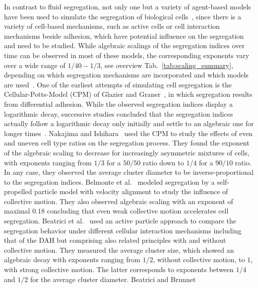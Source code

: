 \documentclass[10pt,letterpaper]{article}
\newcommand{\tabref}[1]{Tab.~\ref{tab:#1}}
\begin{document}
In contrast to fluid segregation, not only one but a variety of
agent-based models have been used to simulate the segregation of
biological
cells~\cite{ZhaThoSwaShiGla2011,MehVic2013,OsbFlePitMaiGav2017}, since
there is a variety of cell-based mechanisms, such as active cells or
cell interaction mechanisms beside adhesion, which have potential
influence on the segregation and need to be studied. While algebraic
scalings of the segregation indices over time can be observed in most
of these models, the corresponding exponents vary over a wide range of
$1/40 - 1/3$, see overview \tabref{scaling_summary}, depending on which segregation mechanisms are
incorporated and which models are used~\cite{BelThoBruAlmCha2008,
  NakIsh2011, BeaBru2011, StrJuuBauKabDuk2014,Dur2021,Kab2012}. One of
the earliest attempts of simulating cell segregation is the
Cellular-Potts-Model (CPM) of Glazier and Graner~\cite{GlaGra1992,
  GlaGra1993}, in which segregation results from differential
adhesion. While the observed segregation indices display a logarithmic
decay, successive studies concluded that the segregation indices
actually follow a logarithmic decay only initially and settle to an
algebraic one for longer
times~\cite{NakIsh2011,BelThoBruAlmCha2008,BeaBru2011,BeaAlmBru2017,Kra2020,Dur2021}.
Nakajima and Ishihara~\cite{NakIsh2011} used the CPM to study the
effects of even and uneven cell type ratios on the segregation
process. They found the exponent of the algebraic scaling to decrease
for increasingly asymmetric mixtures of cells, with exponents ranging
from $1/3$ for a $50/50$ ratio down to $1/4$ for a $90/10$ ratio. In
any case, they observed the average cluster diameter to be
inverse-proportional to the segregation indices. Belmonte et
al.~\cite{BelThoBruAlmCha2008} modeled segregation by a self-propelled
particle model with velocity alignment to study the influence of
collective motion. They also observed algebraic scaling with an
exponent of maximal $0.18$ concluding that even weak collective motion
accelerates cell segregation. Beatrici et al.~\cite{BeaAlmBru2017} used an
active particle approach to compare the segregation behavior under different cellular
interaction mechanisms including that of the DAH but comprising also related principles with
and without collective motion. They measured the average cluster size, which
showed an algebraic decay with exponents ranging from $1/2$, without
collective motion, to $1$, with strong collective motion. The latter
corresponds to exponents between $1/4$ and $1/2$ for the average
cluster diameter. Beatrici and Brunnet~\cite{BeaBru2011}
\end{document}
